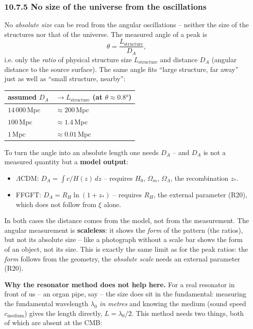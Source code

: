 \subsubsection*{10.7.5 No size of the universe from the oscillations}

No \emph{absolute size} can be read from the angular oscillations --
neither the size of the structures nor that of the universe. The
measured angle of a peak is
\[
  \theta = \frac{L_\mathrm{structure}}{D_A},
\]
i.e. only the \emph{ratio} of physical structure size
$L_\mathrm{structure}$ and distance $D_A$ (angular distance to the
source surface). The same angle fits ``large structure, far away''
just as well as ``small structure, nearby'':

\begin{center}
\begin{tabular}{p{4cm}p{4cm}}
\toprule
\textbf{assumed $D_A$} & \textbf{$\to L_\mathrm{structure}$ (at $\theta\approx0{.}8°$)} \\
\midrule
$14\,000$\,Mpc & $\approx 200$\,Mpc \\
$100$\,Mpc & $\approx 1{.}4$\,Mpc \\
$1$\,Mpc & $\approx 0{.}01$\,Mpc \\
\bottomrule
\end{tabular}
\end{center}

To turn the angle into an absolute length one needs $D_A$ -- and
$D_A$ is not a measured quantity but a \textbf{model output}:
\begin{itemize}
  \item $\Lambda$CDM: $D_A = \int c/H(z)\,dz$ -- requires $H_0$,
        $\Omega_m$, $\Omega_\Lambda$, the recombination $z_*$.
  \item FFGFT: $D_A = R_H\ln(1+z_*)$ -- requires $R_H$, the external
        parameter (R20), which does not follow from $\xi$ alone.
\end{itemize}

In both cases the distance comes from the model, not from the
measurement. The angular measurement is \textbf{scaleless}: it shows
the \emph{form} of the pattern (the ratios), but not its absolute
size -- like a photograph without a scale bar shows the form of an
object, not its size. This is exactly the same limit as for the peak
ratios: the \emph{form} follows from the geometry, the \emph{absolute
scale} needs an external parameter (R20).

\textbf{Why the resonator method does not help here.} For a real
resonator in front of us -- an organ pipe, say -- the size does sit in
the fundamental: measuring the fundamental wavelength $\lambda_0$
\emph{in metres} and knowing the medium (sound speed
$c_\mathrm{medium}$) gives the length directly, $L = \lambda_0/2$. This
method needs two things, both of which are absent at the CMB:

